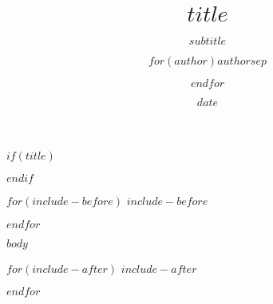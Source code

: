 \documentclass[$if(fontsize)$$fontsize$,$endif$$if(lang)$$babel-lang$,$endif$$if(handout)$handout,$endif$$if(beamer)$,$endif$$for(classoption)$$classoption$$sep$,$endfor$]{$documentclass$}
\title{$title$}
\subtitle{$subtitle$}
\author{$for(author)$$author$$sep$ \and $endfor$}
\date{$date$}
\begin{document}
$if(title)$
\begin{frame}[plain]
  \titlepage
\end{frame}
$endif$



$for(include-before)$
$include-before$

$endfor$

$body$


$for(include-after)$
$include-after$

$endfor$
\end{document}
